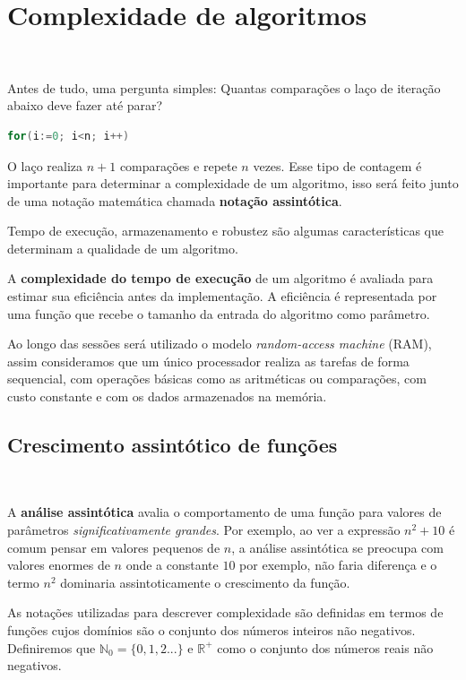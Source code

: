 
\section{Complexidade de algoritmos}
\

Antes de tudo, uma pergunta simples: Quantas comparações o laço de iteração abaixo deve fazer até parar?

\begin{lstlisting}[language=C, frame=single]
    for(i:=0; i<n; i++)
\end{lstlisting}

O laço realiza $n+1$ comparações e repete $n$ vezes. Esse tipo de contagem é importante para determinar a complexidade de um algoritmo, isso será feito junto de uma notação matemática chamada \textbf{notação assintótica}.

Tempo de execução, armazenamento e robustez são algumas características que determinam a qualidade de um algoritmo.

A \textbf{complexidade do tempo de execução} de um algoritmo é avaliada para estimar sua eficiência antes da implementação. A eficiência é representada por uma função que recebe o tamanho da entrada do algoritmo como parâmetro.

Ao longo das sessões será utilizado o modelo \textit{random-access machine} (RAM), assim consideramos que um único processador realiza as tarefas de forma sequencial, com operações básicas como as aritméticas ou comparações, com custo constante e com os dados armazenados na memória.

\subsection{Crescimento assintótico de funções}
\

A \textbf{análise assintótica} avalia o comportamento de uma função para valores de parâmetros \textit{significativamente grandes}. Por exemplo, ao ver a expressão $n^2+10$ é comum pensar em valores pequenos de $n$, a análise assintótica se preocupa com valores enormes de $n$ onde a constante $10$ por exemplo, não faria diferença e o termo $n^2$ dominaria assintoticamente o crescimento da função.

As notações utilizadas para descrever complexidade são definidas em termos de funções cujos domínios são o conjunto dos números inteiros não negativos. Definiremos que $\mathbb{N}_0 = \{0,1,2...\}$ e $\mathbb{R}^{+}$ como o conjunto dos números reais não negativos.

